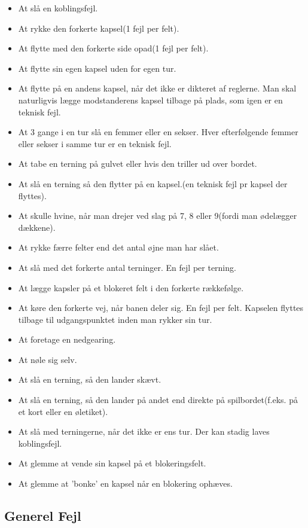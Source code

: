 \documentclass[12pt]{article}
\begin{document}
\begin{itemize}
	\item At slå en koblingsfejl.
	\item At rykke den forkerte kapsel(1 fejl per felt).
	\item At flytte med den forkerte side opad(1 fejl per felt).
	\item At flytte sin egen kapsel uden for egen tur.
	\item At flytte på en andens kapsel, når det ikke er dikteret af reglerne. Man skal naturligvis lægge modstanderens kapsel tilbage på plads, som igen er en teknisk fejl.
	\item At 3 gange i en tur slå en femmer eller en sekser. Hver efterfølgende femmer eller sekser i samme tur er en teknisk fejl.
	\item At tabe en terning på gulvet eller hvis den triller ud over bordet.
	\item At slå en terning så den flytter på en kapsel.(en teknisk fejl pr kapsel der flyttes).
	\item At skulle hvine, når man drejer ved slag på 7, 8 eller 9(fordi man ødelægger dækkene).
	\item At rykke færre felter end det antal øjne man har slået.
	\item At slå med det forkerte antal terninger. En fejl per terning.
	\item At lægge kapsler på et blokeret felt i den forkerte rækkefølge.
	\item At køre den forkerte vej, når banen deler sig. En fejl per felt. Kapselen flyttes tilbage til udgangspunktet inden man rykker sin tur.
	\item At foretage en nedgearing.
	\item At nøle sig selv.
	\item At slå en terning, så den lander skævt.
	\item At slå en terning, så den lander på andet end direkte på spilbordet(f.eks. på et kort eller en øletiket).
	\item At slå med terningerne, når det ikke er ens tur. Der kan stadig laves koblingsfejl.
	\item At glemme at vende sin kapsel på et blokeringsfelt.
	\item At glemme at 'bonke' en kapsel når en blokering ophæves.
\end{itemize}

\subsection*{Generel Fejl}
\end{document}
